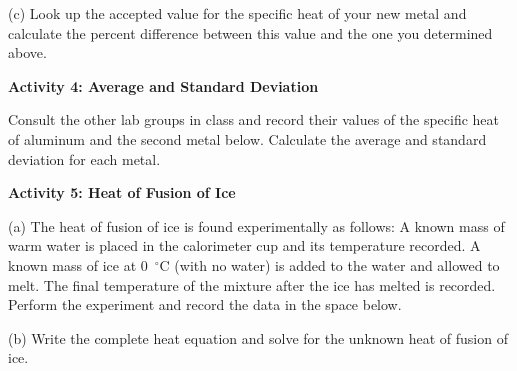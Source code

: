 \answerspace{2.5cm}

(c) Look up the accepted value for the specific heat of your new metal and
calculate the percent difference between this value and the one you
determined above. 
\answerspace{25mm}

\textbf{Activity 4: Average and Standard Deviation}

Consult the other lab groups in class and record their values of the specific
heat of aluminum and the second metal below.
Calculate the average and standard deviation for each metal.
\answerspace{1.2in}


\textbf{Activity 5: Heat of Fusion of Ice}

(a) The heat of fusion of ice is found experimentally as follows:
A known mass of warm water is placed in the calorimeter cup and its
temperature recorded. A known mass of ice at 0~$^{\circ}$C (with
no water) is added to the water and allowed to melt. The final temperature
of the mixture after the ice has melted is recorded. Perform the experiment
and record the data in the space below.

\answerspace{20mm}

(b) Write the complete heat equation and solve for the unknown heat
of fusion of ice.
\answerspace{25mm}

